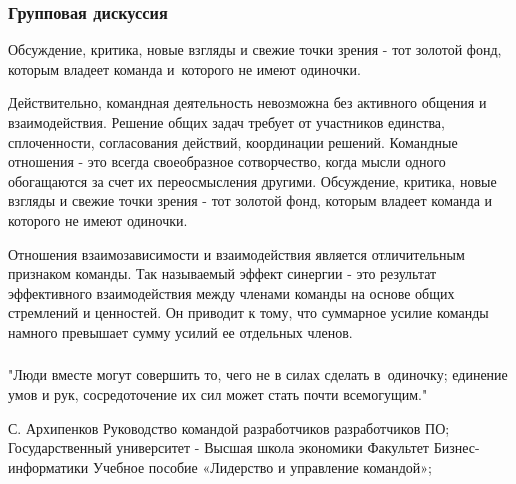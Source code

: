 \documentclass{../industrial-development}
\begin{document}
\begin{frame} \frametitle{Групповая дискуссия}
Обсуждение, критика, новые взгляды и свежие точки зрения - тот золотой фонд, которым владеет команда и~которого не имеют одиночки.
\end{frame}

\lecturenotes

Действительно, командная деятельность невозможна без активного общения и взаимодействия. Решение общих задач требует от участников единства, сплоченности, согласования действий, координации решений. Командные отношения - это всегда своеобразное сотворчество, когда мысли одного обогащаются за счет их переосмысления другими. Обсуждение, критика, новые взгляды и свежие точки зрения - тот золотой фонд, которым владеет команда и которого не имеют одиночки.

Отношения взаимозависимости и взаимодействия является отличительным признаком команды. Так называемый эффект синергии - это результат эффективного взаимодействия между членами команды на основе общих стремлений и ценностей. Он приводит к тому, что суммарное усилие команды намного превышает сумму усилий ее отдельных членов.

\begin{frame} \frametitle{}
"Люди вместе могут совершить то, чего не в силах сделать в~одиночку; единение умов и рук, сосредоточение их сил может стать почти всемогущим."
\end{frame}

\begin{thebibliography}{99}


С. Архипенков Руководство командой разработчиков разработчиков ПО;
Государственный университет  - Высшая школа экономики Факультет Бизнес-информатики Учебное пособие «Лидерство и управление командой»;
\end{thebibliography}
\end{document}
